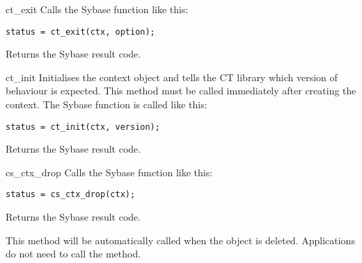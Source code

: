 \begin{methoddesc}[CS_CONTEXT]{ct_exit}{}
Calls the Sybase  function like this:

\begin{verbatim}
status = ct_exit(ctx, option);
\end{verbatim}

Returns the Sybase result code.
\end{methoddesc}

\begin{methoddesc}[CS_CONTEXT]{ct_init}{}
Initialises the context object and tells the CT library which version
of behaviour is expected.  This method must be called immediately
after creating the context.  The Sybase  function
is called like this:

\begin{verbatim}
status = ct_init(ctx, version);
\end{verbatim}

Returns the Sybase result code.
\end{methoddesc}

\begin{methoddesc}[CS_CONTEXT]{cs_ctx_drop}{}
Calls the Sybase  function like this:

\begin{verbatim}
status = cs_ctx_drop(ctx);
\end{verbatim}

Returns the Sybase result code.

This method will be automatically called when the 
object is deleted.  Applications do not need to call the method.
\end{methoddesc}

